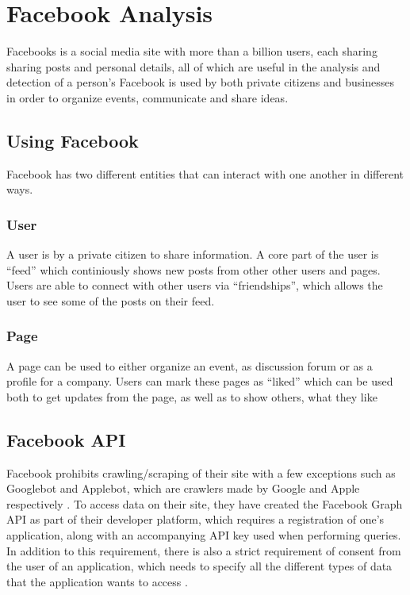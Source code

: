 \section{Facebook Analysis}\label{sec:facebook-analysis}
Facebooks is a social media site with more than a billion users, each
sharing sharing posts and personal details, all of which are useful in the analysis and
detection of a person's \fbp Facebook is used by both private citizens and
businesses in order to organize events, communicate and share ideas. 



\subsection{Using Facebook}
Facebook has two different entities that can interact with one another in
different ways.

\subsubsection{User}
A user is by a private citizen to share information. A core part of the user is
``feed'' which continiously shows new posts from other other users and pages.
Users are able to connect with other users via ``friendships'', which allows
the user to see some of the posts on their feed.

\subsubsection{Page}
A page can be used to either organize an event, as discussion forum or as a
profile for a company. Users can mark these pages as ``liked'' which can be
used both to get updates from the page, as well as to show others, what they
like

\subsection{Facebook API}
Facebook prohibits crawling/scraping of their site with a few exceptions such as
Googlebot and Applebot, which are crawlers made by Google and Apple respectively
\citep{FacebookRobotsTxt}.
To access data on their site, they have created the Facebook Graph \ac{API} as
part of their developer platform, which requires a registration of one's
application, along with an accompanying \ac{API} key used when performing
queries.
In addition to this requirement, there is also a strict requirement of consent
from the user of an application, which needs to specify all the different types
of data that the application wants to access \citep{FacebookGraphApiAccessTokens}.\nl

